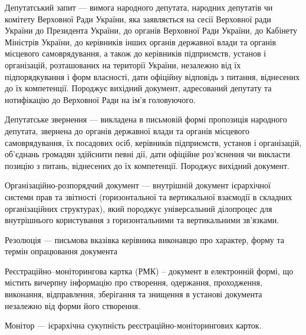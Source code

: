 Депутатський запит — вимога народного депутата, народних депутатів чи
комітету Верховної Ради України, яка заявляється на сесії Верховної ради України
до Президента України, до органів Верховної Ради України, до Кабінету Міністрів
України, до керівників інших органів державної влади та органів місцевого
самоврядування, а також до керівників підприємств, установ і організацій,
розташованих на території України, незалежно від їх підпорядкування і форм
власності, дати офіційну відповідь з питання, віднесених до їх компетенції.
Породжує вихідний документ, адресований депутату та нотифікацію до Верховної
Ради на ім’я головуючого.

Депутатське звернення — викладена в письмовій формі пропозиція народного
депутата, звернена до органів державної влади та органів місцевого
самоврядування, їх посадових осіб, керівників підприємств, установ і організацій,
об'єднань громадян здійснити певні дії, дати офіційне роз'яснення чи викласти
позицію з питань, віднесених до їх компетенції. Породжує вихідний документ.

Організаційно-розпорядчий документ — внутрішній документ ієрархічної
системи прав та звітності (горизонтальної та вертикальної взаємодії в складних
організаційних структурах), який породжує універсальний ділопроцес для
внутрішнього користування з горизонтальними та вертикальними зв’язками.

Резолюція — письмова вказівка керівника виконавцю про характер, форму та
термін опрацювання документа

Реєстраційно–моніторингова картка (РМК) – документ в електронній формі,
що містить вичерпну інформацію про створення, одержання, проходження,
виконання, відправлення, зберігання та знищення в установі документа незалежно
від форми його створення.

Монітор — ієрархічна сукупність реєстраційно-моніторингових карток.

